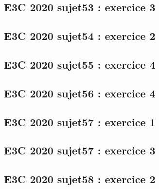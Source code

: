 \documentclass[lang=fr,edition=teacher,layout=sheet]{mxbook}
\begin{document}
\begingroup\endgroup
\par\bigskip
{}\subsection*{E3C 2020 sujet53 : exercice 3}
\begingroup\endgroup
\par\bigskip
{}\subsection*{E3C 2020 sujet54 : exercice 2}
\begingroup\endgroup
\par\bigskip
{}\subsection*{E3C 2020 sujet55 : exercice 4}
\begingroup\endgroup
\par\bigskip
{}\subsection*{E3C 2020 sujet56 : exercice 4}
\begingroup\endgroup
\par\bigskip
{}\subsection*{E3C 2020 sujet57 : exercice 1}
\begingroup\endgroup
\par\bigskip
{}\subsection*{E3C 2020 sujet57 : exercice 3}
\begingroup\endgroup
\par\bigskip
{}\subsection*{E3C 2020 sujet58 : exercice 2}
\end{document}
